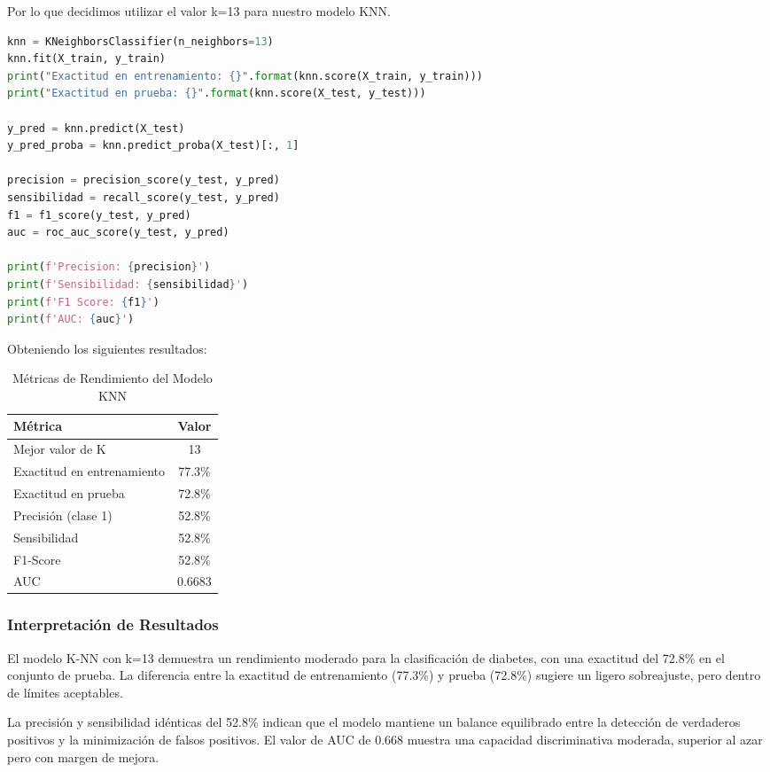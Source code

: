 \documentclass[12pt,a4paper]{article}
\begin{document}
Por lo que decidimos utilizar el valor k=13 para nuestro modelo KNN.

\begin{lstlisting}[language=Python, frame=single, basicstyle=\ttfamily\small, breaklines=true]
knn = KNeighborsClassifier(n_neighbors=13)
knn.fit(X_train, y_train)
print("Exactitud en entrenamiento: {}".format(knn.score(X_train, y_train)))
print("Exactitud en prueba: {}".format(knn.score(X_test, y_test)))

y_pred = knn.predict(X_test)
y_pred_proba = knn.predict_proba(X_test)[:, 1]

precision = precision_score(y_test, y_pred)
sensibilidad = recall_score(y_test, y_pred)
f1 = f1_score(y_test, y_pred)
auc = roc_auc_score(y_test, y_pred)

print(f'Precision: {precision}')
print(f'Sensibilidad: {sensibilidad}')
print(f'F1 Score: {f1}')
print(f'AUC: {auc}')
\end{lstlisting}

Obteniendo los siguientes resultados:

\begin{table}[H]
\centering
\caption{Métricas de Rendimiento del Modelo KNN}\label{tab:knn_resultados}
\begin{tabular}{lc}
\toprule
\textbf{Métrica} & \textbf{Valor} \\
\midrule
Mejor valor de K & 13 \\
Exactitud en entrenamiento & 77.3\% \\
Exactitud en prueba & 72.8\% \\
Precisión (clase 1) & 52.8\% \\
Sensibilidad & 52.8\% \\
F1-Score & 52.8\% \\
AUC & 0.6683 \\
\bottomrule
\end{tabular}
\end{table}

\subsubsection{Interpretación de Resultados}
El modelo K-NN con k=13 demuestra un rendimiento moderado para la clasificación de diabetes, 
con una exactitud del 72.8\% en el conjunto de prueba. La diferencia entre la exactitud de 
entrenamiento (77.3\%) y prueba (72.8\%) sugiere un ligero sobreajuste, pero dentro de límites 
aceptables.

La precisión y sensibilidad idénticas del 52.8\% indican que el modelo mantiene un balance 
equilibrado entre la detección de verdaderos positivos y la minimización de falsos positivos. 
El valor de AUC de 0.668 muestra una capacidad discriminativa moderada, superior al azar pero 
con margen de mejora.
\end{document}
